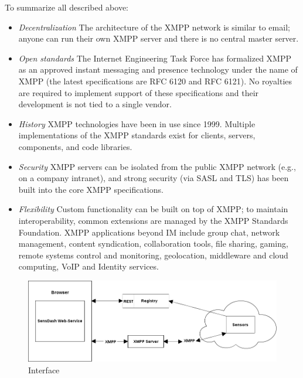       To summarize all described above:
    \begin{itemize}
      \item \emph{Decentralization}
        The architecture of the XMPP network is similar to email; anyone can run their own XMPP server and there is no central master server.
     \item \emph{Open standards}
        The Internet Engineering Task Force has formalized XMPP as an approved instant messaging and presence technology under the name of XMPP (the latest specifications are RFC 6120 and RFC 6121). No royalties are required to implement support of these specifications and their development is not tied to a single vendor.
      \item \emph{History}
        XMPP technologies have been in use since 1999. Multiple implementations of the XMPP standards exist for clients, servers, components, and code libraries.
      \item \emph{Security}
        XMPP servers can be isolated from the public XMPP network (e.g., on a company intranet), and strong security (via SASL and TLS) has been built into the core XMPP specifications.
      \item \emph{Flexibility}
        Custom functionality can be built on top of XMPP; to maintain interoperability, common extensions are managed by the XMPP Standards Foundation. XMPP applications beyond IM include group chat, network management, content syndication, collaboration tools, file sharing, gaming, remote systems control and monitoring, geolocation, middleware and cloud computing, VoIP and Identity services.
      \end{itemize}

      \begin{figure}[!ht]
      \centering
      \includegraphics[scale=0.5]{images/Interface.png}   
      \caption[Interface]{Interface}
      \label{img:interfaces}                           
      \end{figure}

